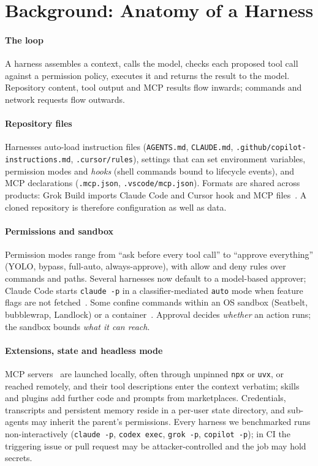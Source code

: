 \section{Background: Anatomy of a Harness}\label{sec:background}

\paragraph*{The loop} A harness assembles a context, calls the model, checks each proposed tool call against a permission policy, executes it and returns the result to the model. Repository content, tool output and MCP results flow inwards; commands and network requests flow outwards.

\paragraph*{Repository files} Harnesses auto-load instruction files (\texttt{AGENTS.md}, \texttt{CLAUDE.md}, \texttt{.github/copilot-instructions.md}, \texttt{.cursor/rules}), settings that can set environment variables, permission modes and \emph{hooks} (shell commands bound to lifecycle events), and MCP declarations (\texttt{.mcp.json}, \texttt{.vscode/mcp.json}). Formats are shared across products: Grok Build imports Claude Code and Cursor hook and MCP files\evD~\cite{grokbuild_hooks,grokbuild_mcp}. A cloned repository is therefore configuration as well as data.

\paragraph*{Permissions and sandbox} Permission modes range from ``ask before every tool call'' to ``approve everything'' (YOLO, bypass, full-auto, always-approve), with allow and deny rules over commands and paths. Several harnesses now default to a model-based approver; Claude Code starts \texttt{claude -p} in a classifier-mediated \texttt{auto} mode when feature flags are not fetched\evD\evT~\cite{cc_permission_modes}. Some confine commands within an OS sandbox (Seatbelt, bubblewrap, Landlock) or a container\evD~\cite{cc_sandboxing}. Approval decides \emph{whether} an action runs; the sandbox bounds \emph{what it can reach}.

\paragraph*{Extensions, state and headless mode} MCP servers~\cite{mcpspec} are launched locally, often through unpinned \texttt{npx} or \texttt{uvx}, or reached remotely, and their tool descriptions enter the context verbatim; skills and plugins add further code and prompts from marketplaces. Credentials, transcripts and persistent memory reside in a per-user state directory, and sub-agents may inherit the parent's permissions. Every harness we benchmarked runs non-interactively\evD\evT{} (\texttt{claude -p}, \texttt{codex exec}, \texttt{grok -p}, \texttt{copilot -p}); in CI the triggering issue or pull request may be attacker-controlled and the job may hold secrets.
